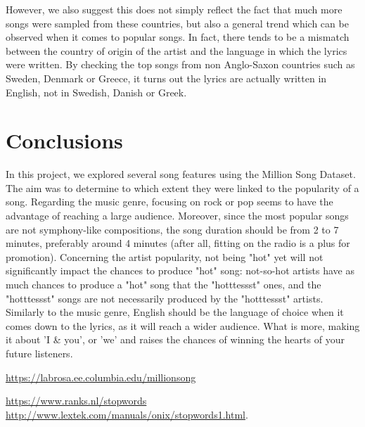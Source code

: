 \documentclass[11pt]{article}
\renewcommand\_{\textunderscore\allowbreak}
\begin{document}
However, we also suggest this does not simply reflect the fact that much more songs were sampled from these countries, but also a general trend which can be observed when it comes to popular songs.
In fact, there tends to be a mismatch between the country of origin of the artist and the language in which the lyrics were written.
By checking the top songs from non Anglo-Saxon countries such as Sweden, Denmark or Greece, it turns out the lyrics are actually written in English, not in Swedish, Danish or Greek.


	
\section{Conclusions}
In this project, we explored several song features using the Million Song Dataset. The aim was to determine to which extent they were linked to the popularity of a song.
Regarding the music genre, focusing on rock or pop seems to have the advantage of reaching a large audience.
Moreover, since the most popular songs are not symphony-like compositions, the song duration should be from 2 to 7 minutes, preferably around 4 minutes (after all, fitting on the radio is a plus for promotion).
Concerning the artist popularity, not being "hot" yet will not significantly impact the chances to produce "hot" song: not-so-hot artists have as much chances to produce a "hot" song that the "hotttessst" ones, and the "hotttessst" songs are not necessarily produced by the "hotttessst" artists.
Similarly to the music genre, English should be the language of choice when it comes down to the lyrics, as it will reach a wider audience. What is more, making it about 'I \& you', or 'we' and raises the chances of winning the hearts of your future listeners.


\begin{thebibliography}{}
\url{https://labrosa.ee.columbia.edu/millionsong}

\url{https://www.ranks.nl/stopwords}\\
\url{http://www.lextek.com/manuals/onix/stopwords1.html}.


\end{thebibliography}
\end{document}
